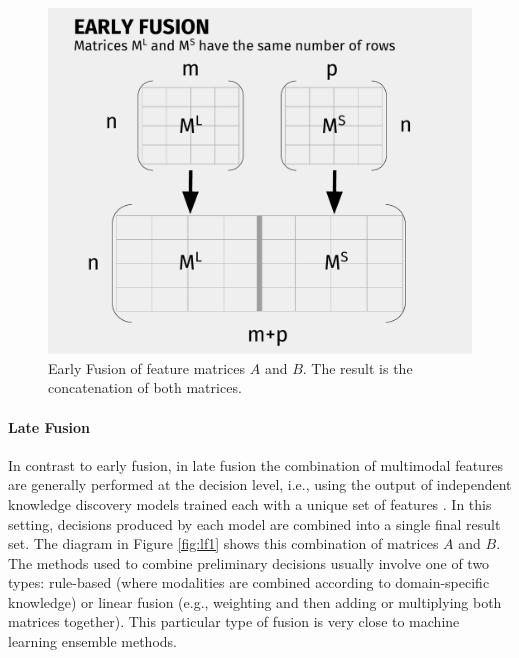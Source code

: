 \begin{figure}
\centering
\includegraphics[width=0.7\linewidth]{images/Chapitre3/ef_diag.pdf}
\caption{Early Fusion of feature matrices $A$ and $B$. The result is the concatenation of both matrices.}
\label{fig:ef_diag}
\end{figure}


%


%
\paragraph{Late Fusion}
In contrast to early fusion, in late fusion the combination of multimodal features are generally performed at the decision level, i.e., using the output of independent knowledge discovery models trained  each with a unique set of features \cite{ClinchantAC11}. In this setting,  decisions produced by each model are combined into a single final result set. The diagram in Figure \ref{fig:lf1} shows this combination of matrices $A$ and $B$.
%
The methods used to combine preliminary decisions usually involve one of two types: rule-based (where modalities are combined according to domain-specific knowledge) or linear fusion (e.g., weighting and then adding or multiplying both matrices together). This particular type of fusion is very close to machine learning  ensemble methods.
%

